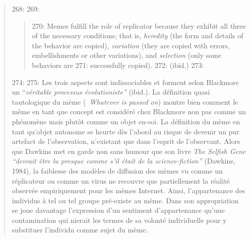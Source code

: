 \begin{quote}
268: 
269: \begin{quote}
270: Memes fulfill the role of replicator because they exhibit all three of the necessary conditions; that is, \textit{heredity} (the form and details of the behavior are copied), \textit{variation} (they are copied with errors, embellishments or other variations), and \textit{selection} (only some behaviors are
271: successfully copied).
272: (ibid.)
273: \end{quote}
274: 
275: Les trois aspects sont indissociables et forment selon Blackmore un {\textquotedblleft}\textit{v\'eritable processus \'evolutioniste{\textquotedblright} }(ibid.). La d\'efinition quasi tautologique du m\`eme ({\guillemotleft}~\textit{Whatever is passed on{\guillemotright}}) montre bien comment le m\`eme en tant que concept est consid\'er\'e chez Blackmore non pas comme un ph\'enom\`ene mais plut\^ot comme un objet en-soi. La d\'efinition du m\`eme en tant qu{\textquoteright}objet autonome se heurte d\`es l{\textquoteright}abord au risque de devenir un pur artefact de l{\textquoteright}observation, n{\textquoteright}existant que dans l{\textquoteright}esprit de l{\textquoteright}observant. Alors que Dawkins met en garde non sans humour que son livre \textit{The Selfish Gene} \textit{{\textquotedblleft}devrait \^etre lu presque comme s{\textquoteright}il \'etait de la science-fiction{\textquotedblright} }(Dawkins, 1984), la faiblesse des mod\`eles de diffusion des m\`emes vu comme un r\'eplicateur ou comme un virus ne recouvre que partiellement la r\'ealit\'e observ\'ee empiriquement pour les m\`emes Internet. Ainsi, l{\textquoteright}appartenance des individus \`a tel ou tel groupe pr\'e-existe au m\`eme. Dans son appropriation se joue davantage l{\textquoteright}expression d{\textquoteright}un sentiment d{\textquoteright}appartenance qu{\textquoteright}une contamination qui nierait les termes de sa volont\'e individuelle pour y substituer l{\textquoteright}individu comme sujet du m\`eme.  

\end{quote}
